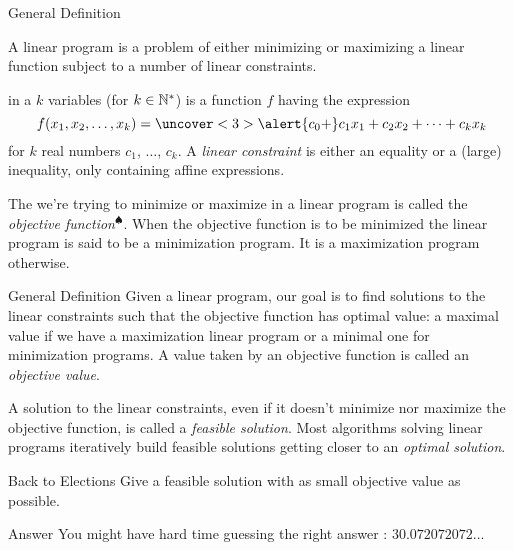\documentclass[aspectratio = 169]{beamer}
\begin{document}
\begin{frame}{General Definition}
\begin{defn}
  A linear program is a problem of either minimizing or maximizing a
  linear function subject to a number of linear constraints.
\end{defn}
 in a $k$ variables (for $k \in \mathbb{N}^*$) is a function $f$
having the expression
    \[
\        f(x_1, x_2, \ldots, x_k) = \uncover<3>{\alert{c_0 + }} c_1x_1 + c_2x_2 + \cdots + c_kx_k
    \]
    for $k$ real numbers $c_1$, $\ldots$, $c_k$. A \emph{linear
      constraint} is either an equality or a (large) inequality, only
    containing affine expressions.

    \pause
    The  we're trying to minimize or maximize in a linear
    program is called the \emph{objective
      function}$^{\spadesuit}$. When the objective function is to be
    minimized the linear program is said to be a minimization
    program. It is a maximization program otherwise.
\end{frame}

\begin{frame}{General Definition}
  Given a linear program, our goal is to find solutions to the linear
  constraints such that the objective function has optimal value: a
  maximal value if we have a maximization linear program or a minimal
  one for minimization programs. A value taken by an objective
  function is called an \emph{objective value}.

  \pause
  A solution to the linear constraints, even if it doesn't minimize
  nor maximize the objective function, is called a \emph{feasible
    solution}. Most algorithms solving linear programs iteratively
  build feasible solutions getting closer to an \emph{optimal
    solution}.
  \pause
    \begin{halfshyblock}{Back to Elections}
        Give a feasible solution with as small objective value as possible.
    \end{halfshyblock}
    \pause
    \begin{alertblock}{Answer}
      You might have hard time guessing the right answer : $30.072072072\ldots$
    \end{alertblock}
\end{frame}
\end{document}
